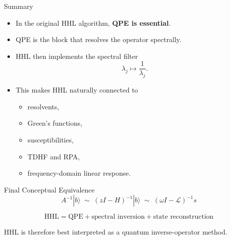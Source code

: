 \documentclass{beamer}
\begin{document}
\begin{frame}{Summary}
\begin{itemize}
\item In the original HHL algorithm, \textbf{QPE is essential}.
\item QPE is the block that resolves the operator spectrally.
\item HHL then implements the spectral filter
\[
\lambda_j \mapsto \frac{1}{\lambda_j}.
\]
\item This makes HHL naturally connected to
\begin{itemize}
\item resolvents,
\item Green's functions,
\item susceptibilities,
\item TDHF and RPA,
\item frequency-domain linear response.
\end{itemize}
\end{itemize}
\end{frame}


\begin{frame}{Final Conceptual Equivalence}
\[
\boxed{
A^{-1}|b\rangle
\;\sim\;
(zI-H)^{-1}|b\rangle
\;\sim\;
(\omega I-\mathcal{L})^{-1}s
}
\]

\vspace{0.4cm}
\[
\boxed{
\text{HHL}=
\text{QPE}
+
\text{spectral inversion}
+
\text{state reconstruction}
}
\]

HHL is therefore best interpreted as a quantum inverse-operator method.
\end{frame}
\end{document}

